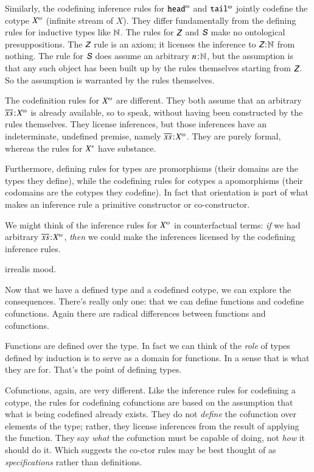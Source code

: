 Similarly, the codefining inference rules for \(\cohead\) and
\(\cotail\) jointly codefine the cotype \(\colist{X}\) (infinite
stream of \(X\)). They differ fundamentally from the defining rules
for inductive types like \(\mathbb{N}\). The rules for \(\ZNat\) and
\(\SNat\) make no ontological presuppositions. The \(\ZNat\) rule is
an axiom; it licenses the inference to \(\tj{\ZNat}{\Nat}\) from
nothing. The rule for \(\SNat\) does assume an arbitrary
\(n\hspace{1pt}\mathpunct{:}\hspace{-1pt}\mathbb{N}\), but the assumption is that any such object has been
built up by the rules themselves starting from \(\ZNat\). So the
assumption is warranted by the rules themselves.

The codefinition rules for \(\colist{X}\) are different. They both
assume that an arbitrary \(\tj{\coseq{x}}{\colist{X}}\) is already
available, so to speak, without having been constructed by the rules
themselves. They license inferences, but those inferences have an
indeterminate, undefined premise, namely
\(\tj{\coseq{x}}{\colist{X}}\). They are purely formal, whereas the
rules for \({X^{*}}\) have substance.

Furthermore, defining rules for types are promorphisms (their domains
are the types they define), while the codefining rules for cotypes a
apomorphisms (their codomains are the cotypes they codefine). In fact
that orientation is part of what makes an inference rule a primitive
constructor or co-constructor.

We might think of the inference rules for \(\colist{X}\) in
counterfactual terms: \textit{if} we had arbitrary
\(\tj{\coseq{x}}{\colist{X}}\), \textit{then} we could make the
inferences licensed by the codefining inference rules.

irrealis mood.

Now that we have a defined type and a codefined cotype, we can explore
the consequences. There's really only one: that we can define
functions and codefine cofunctions. Again there are radical differences between functions and cofunctions.

Functions are defined over the type. In fact we can think of the
\textit{role} of types defined by induction is to serve as a domain
for functions. In a sense that is what they are for. That's the point
of defining types.

Cofunctions, again, are very different. Like the inference rules for
codefining a cotype, the rules for codefining cofunctions are based on
the assumption that what is being codefined already exists. They do
not \textit{define} the cofunction over elements of the type; rather,
they license inferences from the result of applying the function. They
say \textit{what} the cofunction must be capable of doing, not
\textit{how} it should do it. Which suggests the co-ctor rules may be
best thought of as \textit{specifications} rather than definitions.

